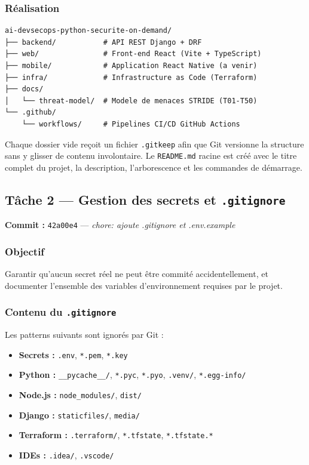 \documentclass[11pt,a4paper]{article}
\begin{document}
\subsubsection*{Réalisation}

\begin{lstlisting}[caption={Arborescence du monorepo (état initial)}]
ai-devsecops-python-securite-on-demand/
├── backend/           # API REST Django + DRF
├── web/               # Front-end React (Vite + TypeScript)
├── mobile/            # Application React Native (a venir)
├── infra/             # Infrastructure as Code (Terraform)
├── docs/
│   └── threat-model/  # Modele de menaces STRIDE (T01-T50)
└── .github/
    └── workflows/     # Pipelines CI/CD GitHub Actions
\end{lstlisting}

Chaque dossier vide reçoit un fichier \texttt{.gitkeep} afin que Git versionne la structure
sans y glisser de contenu involontaire. Le \texttt{README.md} racine est créé avec le titre
complet du projet, la description, l'arborescence et les commandes de démarrage.

\subsection{Tâche 2 --- Gestion des secrets et \texttt{.gitignore}}

\textbf{Commit :} \texttt{42a00e4} --- \textit{chore: ajoute .gitignore et .env.example}

\subsubsection*{Objectif}

Garantir qu'aucun secret réel ne peut être commité accidentellement, et documenter
l'ensemble des variables d'environnement requises par le projet.

\subsubsection*{Contenu du \texttt{.gitignore}}

Les patterns suivants sont ignorés par Git :

\begin{itemize}
  \item \textbf{Secrets :} \texttt{.env}, \texttt{*.pem}, \texttt{*.key}
  \item \textbf{Python :} \texttt{\_\_pycache\_\_/}, \texttt{*.pyc}, \texttt{*.pyo},
    \texttt{.venv/}, \texttt{*.egg-info/}
  \item \textbf{Node.js :} \texttt{node\_modules/}, \texttt{dist/}
  \item \textbf{Django :} \texttt{staticfiles/}, \texttt{media/}
  \item \textbf{Terraform :} \texttt{.terraform/}, \texttt{*.tfstate}, \texttt{*.tfstate.*}
  \item \textbf{IDEs :} \texttt{.idea/}, \texttt{.vscode/}
\end{itemize}
\end{document}
